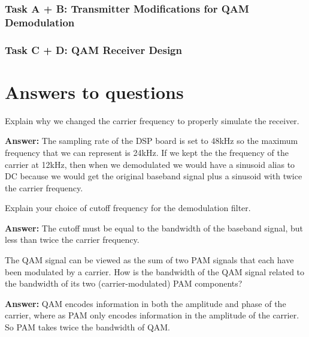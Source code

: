 \documentclass{article}
\begin{document}
\subsubsection{Task A + B: Transmitter Modifications for QAM Demodulation}

\subsubsection{Task C + D: QAM Receiver Design}



\section{Answers to questions}

\begin{enumerate}
  \begin{item}
    Explain why we changed the carrier frequency to properly simulate the receiver. 

  \textbf{Answer:}
    The sampling rate of the DSP board is set to 48kHz so the maximum frequency that we can represent is 24kHz.
    If we kept the the frequency of the carrier at 12kHz, then when we demodulated we would have a sinusoid alias to DC
    because we would get the original baseband signal plus a sinusoid with twice the carrier frequency.
  \end{item}

  \begin{item}
    Explain your choice of cutoff frequency for the demodulation filter.

  \textbf{Answer:}
    The cutoff must be equal to the bandwidth of the baseband signal, but less than twice the carrier frequency.
  \end{item}

  \begin{item}
    The QAM signal can be viewed as the sum of two PAM signals that each have been modulated by a carrier. How is the bandwidth of the QAM signal related to the bandwidth of its two (carrier-modulated) PAM components?

  \textbf{Answer:}
    QAM encodes information in both the amplitude and phase of the carrier, where as PAM only encodes information in the amplitude of the carrier.
    So PAM takes twice the bandwidth of QAM.

  \end{item}
\end{enumerate}
\end{document}
